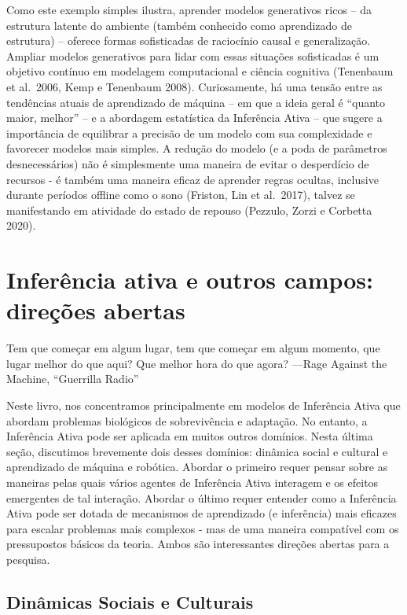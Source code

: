 \documentclass[
  12pt,
]{book}
\begin{document}
Como este exemplo simples ilustra, aprender modelos generativos ricos -- da estrutura latente do ambiente (também conhecido como aprendizado de estrutura) -- oferece formas sofisticadas de raciocínio causal e generalização. Ampliar modelos generativos para lidar com essas situações sofisticadas é um objetivo contínuo em modelagem computacional e ciência cognitiva (Tenenbaum et al.~2006, Kemp e Tenenbaum 2008). Curiosamente, há uma tensão entre as tendências atuais de aprendizado de máquina -- em que a ideia geral é ``quanto maior, melhor'' -- e a abordagem estatística da Inferência Ativa -- que sugere a importância de equilibrar a precisão de um modelo com sua complexidade e favorecer modelos mais simples. A redução do modelo (e a poda de parâmetros desnecessários) não é simplesmente uma maneira de evitar o desperdício de recursos - é também uma maneira eficaz de aprender regras ocultas, inclusive durante períodos offline como o sono (Friston, Lin et al.~2017), talvez se manifestando em atividade do estado de repouso (Pezzulo, Zorzi e Corbetta 2020).

\hypertarget{inferuxeancia-ativa-e-outros-campos-direuxe7uxf5es-abertas}{%
\section{Inferência ativa e outros campos: direções abertas}\label{inferuxeancia-ativa-e-outros-campos-direuxe7uxf5es-abertas}}

Tem que começar em algum lugar, tem que começar em algum momento, que lugar melhor do que aqui? Que melhor hora do que agora?
---Rage Against the Machine, ``Guerrilla Radio''

Neste livro, nos concentramos principalmente em modelos de Inferência Ativa que abordam problemas biológicos de sobrevivência e adaptação. No entanto, a Inferência Ativa pode ser aplicada em muitos outros domínios. Nesta última seção, discutimos brevemente dois desses domínios: dinâmica social e cultural e aprendizado de máquina e robótica. Abordar o primeiro requer pensar sobre as maneiras pelas quais vários agentes de Inferência Ativa interagem e os efeitos emergentes de tal interação. Abordar o último requer entender como a Inferência Ativa pode ser dotada de mecanismos de aprendizado (e inferência) mais eficazes para escalar problemas mais complexos - mas de uma maneira compatível com os pressupostos básicos da teoria. Ambos são interessantes direções abertas para a pesquisa.

\hypertarget{dinuxe2micas-sociais-e-culturais}{%
\subsection{Dinâmicas Sociais e Culturais}\label{dinuxe2micas-sociais-e-culturais}}
\end{document}
